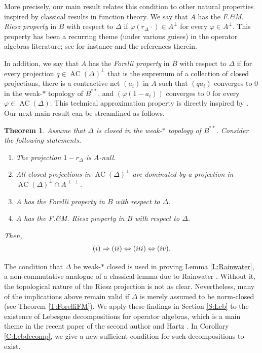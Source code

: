 \documentclass[10pt]{amsart}
\renewcommand{\phi}{\varphi}
\newcommand{\AC}{\operatorname{AC}}
\newtheorem{theoremx}{Theorem}
\theoremstyle{definition}
\begin{document}
More precisely, our main result relates this condition to other natural properties inspired by classical results in function theory. We say that $A$ has the \emph{F.\&M. Riesz property} in $B$ with respect to $\Delta$ if $\phi( r_\Delta\cdot )\in A^\perp$ for every $\phi\in A^\perp$. This property has been a recurring theme (under various guises) in the operator algebras literature; see for instance \cite{BL2007,CH2025} and the references therein.  

In addition, we say that $A$ has the \emph{Forelli property} in $B$ with respect to $\Delta$ if for every projection $q\in \AC(\Delta)^\perp$  that is the supremum of a collection of closed projections,  there is a contractive net $(a_i)$ in $A$ such that $(q a_i )$ converges to $0$ in the weak-$*$ topology of $B^{**}$, and $(\phi(1-a_i))$ converges to $0$ for every $\phi\in \AC(\Delta)$.  This technical approximation property is directly inspired by \cite[Lemma 9.5.5]{rudin2008}. Our 
next main result can be streamlined as follows.


\begin{theoremx}\label{T:C}
Assume that $\Delta$ is closed in the weak-$*$ topology of $B^{**}$. Consider the following statements.
\begin{enumerate}[{\rm (i)}]
\item The projection $1-r_\Delta$ is $A$-null.
\item All closed projections in $\AC(\Delta)^\perp$ are dominated by a projection in $\AC(\Delta)^\perp\cap A^{\perp\perp}$.
\item $A$ has the Forelli property in $B$ with respect to $\Delta$.
\item $A$ has the F.\&M. Riesz property in $B$ with respect to $\Delta$.
\end{enumerate}
Then,
\[
{\rm (i)}\Rightarrow {\rm (ii)}\Leftrightarrow {\rm (iii)}\Leftrightarrow {\rm (iv)}.
\]
\end{theoremx}
 
The condition that $\Delta$ be weak-$*$ closed is used in proving Lemma \ref{L:Rainwater}, a non-commutative analogue of a classical lemma due to Rainwater \cite{rainwater1969}. Without it, the topological nature of the Riesz projection is not as clear. Nevertheless, many of the implications above remain valid if $\Delta$ is merely assumed to be norm-closed (see Theorem \ref{T:ForelliFM}). We apply these findings in Section \ref{S:Leb} to the existence of Lebesgue decompositions for operator algebras, which is a main theme in the recent paper 
of the second author and Hartz \cite{CH2025}. 
In Corollary \ref{C:Lebdecomp}, we give a new sufficient condition for such decompositions to exist.
\end{document}
